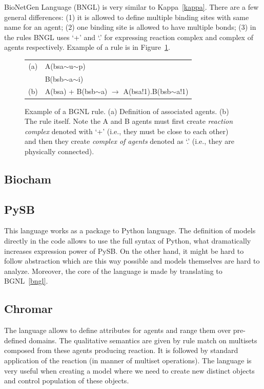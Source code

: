 \documentclass[12pt]{fithesis2}
\begin{document}
BioNetGen Language (BNGL) is very similar to Kappa~\ref{kappa}. There are a few general differences: (1) it is allowed to define multiple binding sites with same name for an agent; (2) one binding site is allowed to have multiple bonds; (3) in the rules BNGL uses `+' and `.' for expressing reaction complex and complex of agents respectively. Example of a rule is in Figure~\ref{bngl-rule}.

\begin{figure}
\begin{center}
\begin{tabular}{c l}
(a) & A(bsa$\sim$u$\sim$p) \\
	& B(bsb$\sim$a$\sim$i) \\
(b) & A(bsa) + B(bsb$\sim$a) $\rightarrow$ A(bsa!1).B(bsb$\sim$a!1) \\
\end{tabular}
\end{center}
\caption{Example of a BGNL rule. (a) Definition of associated agents. (b) The rule itself. Note the A and B agents must first create \emph{reaction complex} denoted with `+' (i.e., they must be close to each other) and then they create \emph{complex of agents} denoted as `.' (i.e., they are physically connected).}\label{bngl-rule}
\end{figure}

\subsection{Biocham}

\subsection{PySB}

This language works as a package to Python language. The definition of models directly in the code allows to use the full syntax of Python, what dramatically increases expression power of PySB. On the other hand, it might be hard to follow abstraction which are this way possible and models themselves are hard to analyze. Moreover, the core of the language is made by translating to BGNL~\ref{bngl}.

\subsection{Chromar}

The language allows to define attributes for agents and range them over pre-defined domains. The qualitative semantics are given by rule match on multisets composed from these agents producing reaction. It is followed by standard application of the reaction (in manner of multiset operations). The language is very useful when creating a model where we need to create new distinct objects and control population of these objects.
\end{document}
